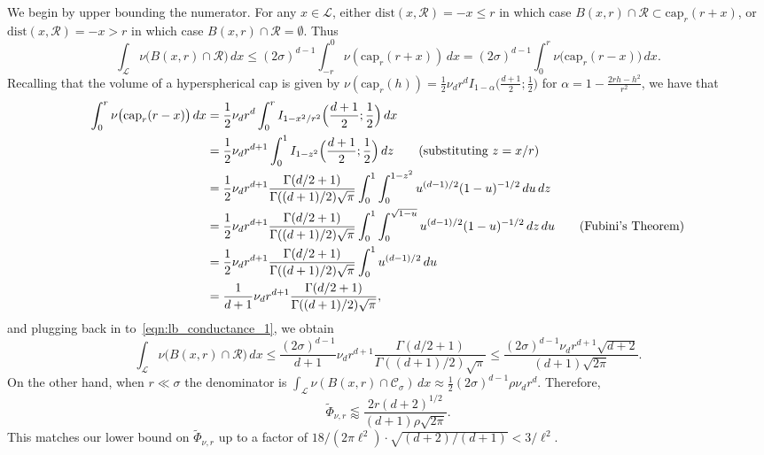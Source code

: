 \documentclass{article}
\newcommand{\dist}{\mathrm{dist}}
\newcommand{\1}{\mathbf{1}}
\newcommand{\mc}[1]{\mathcal{#1}}
\newcommand{\wt}[1]{\widetilde{#1}}
\theoremstyle{definition}
\theoremstyle{remark}
\begin{document}
We begin by upper bounding the numerator. For any $x \in \mc{L}$, either $\dist(x,\mc{R}) = -x \leq r$ in which case $B(x,r) \cap \mc{R} \subset \mathrm{cap}_r(r + x)$, or $\dist(x,\mc{R}) = -x > r$ in which case $B(x,r) \cap \mc{R} = \emptyset$. Thus
\begin{equation}
\label{eqn:lb_conductance_1}
\int_{\mc{L}} \nu\bigl(B(x,r) \cap \mc{R}\bigr) \,dx \leq (2\sigma)^{d - 1} \int_{-r}^{0} \nu(\mathrm{cap}_r(r + x)) \,dx = (2\sigma)^{d - 1} \int_{0}^{r} \nu\bigl(\mathrm{cap}_r(r - x)\bigr) \,dx.
\end{equation}
Recalling that the volume of a hyperspherical cap is given by $\nu(\mathrm{cap}_r(h)) = \frac{1}{2}\nu_dr^dI_{1 - \alpha}\biggl(\frac{d + 1}{2};\frac{1}{2}\biggr)$ for $\alpha = 1 - \frac{2rh - h^2}{r^2}$, we have that
\begin{align*}
\int_{0}^{r} \nu\bigl(\mathrm{cap}_r(r - x)\bigr) \,dx & = \frac{1}{2}\nu_dr^d \int_{0}^{r} I_{1 - x^2/r^2}\Bigl(\frac{d + 1}{2}; \frac{1}{2}\Bigr) \,dx \\
& = \frac{1}{2}\nu_dr^{d + 1} \int_{0}^{1} I_{1 - z^2}\Bigl(\frac{d + 1}{2}; \frac{1}{2}\Bigr) \,dz \tag{substituting $z = x/r$}\\ 
& = \frac{1}{2}\nu_dr^{d + 1} \frac{\Gamma(d/2 + 1)}{\Gamma((d + 1)/2)\sqrt{\pi}} \int_{0}^{1} \int_{0}^{1 - z^2} u^{(d - 1)/2} (1 - u)^{-1/2} \,du \,dz \\
& = \frac{1}{2}\nu_dr^{d + 1} \frac{\Gamma(d/2 + 1)}{\Gamma((d + 1)/2)\sqrt{\pi}} \int_{0}^{1} \int_{0}^{\sqrt{1 - u}} u^{(d - 1)/2} (1 - u)^{-1/2} \,dz \,du \tag{Fubini's Theorem} \\
& = \frac{1}{2}\nu_dr^{d + 1} \frac{\Gamma(d/2 + 1)}{\Gamma((d + 1)/2)\sqrt{\pi}} \int_{0}^{1} u^{(d - 1)/2} \,du \\
& = \frac{1}{d + 1}\nu_dr^{d + 1} \frac{\Gamma(d/2 + 1)}{\Gamma((d + 1)/2)\sqrt{\pi}},
\end{align*}
and plugging back in to~\eqref{eqn:lb_conductance_1}, we obtain
\begin{equation*}
\int_{\mc{L}} \nu\bigl(B(x,r) \cap \mc{R}\bigr) \,dx \leq \frac{(2\sigma)^{d-1}}{d + 1}\nu_dr^{d + 1} \frac{\Gamma(d/2 + 1)}{\Gamma((d + 1)/2)\sqrt{\pi}} \leq \frac{(2\sigma)^{d - 1} \nu_d r^{d + 1}\sqrt{d + 2}}{(d + 1)\sqrt{2\pi}}.
\end{equation*}
On the other hand, when $r \ll \sigma$ the denominator is $\int_{\mc{L}}\nu(B(x,r) \cap \mc{C}_{\sigma}) \,dx \approx \frac{1}{2}(2\sigma)^{d - 1} \rho \nu_d r^d$. Therefore,
\begin{equation*}
\wt{\Phi}_{\nu,r} \lessapprox \frac{2r(d + 2)^{1/2}}{(d + 1)\rho \sqrt{2\pi}}.
\end{equation*}
This matches our lower bound on $\wt{\Phi}_{\nu,r}$ up to a factor of $18/(2\pi\ell^2) \cdot \sqrt{(d + 2)/(d + 1)} < 3/\ell^2.$
\end{document}
